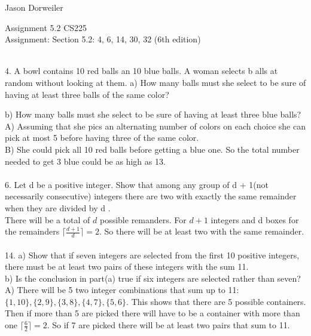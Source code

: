\documentclass[12]{article}
\begin{document}
Jason Dorweiler

Assignment 5.2 CS225\\
Assignment: Section 5.2: 4, 6, 14, 30, 32 (6th edition)

\hrulefill\\

4. A bowl contains 10 red balls an 10 blue balls. A woman selects b
alls at random without
looking at them.
a) How many balls must she select to be sure of having at least three balls of the same
color?

b) How many balls must she select to be sure of having at least three blue balls?\\


A) Assuming that she pics an alternating number of colors on each choice she can pick at most 5 before having three of the same color.\\

B) She could pick all 10 red balls before getting a blue one.  So the total number needed to get 3 blue could be as high as 13. \\

\hrulefill\\

6. Let
d
be a positive integer. Show that among any group of
d
+ 1(not necessarily consecutive) integers there are two with exactly the same remainder when they are divided by
d
.\\

There will be a total of $d$ possible remanders.  For $d+1$ integers and d boxes for the remainders $\lceil{\frac{d+1}{d}}\rceil = 2$.  So there will be at least two with the same remainder. \\

\hrulefill\\

14. a) Show that if seven integers are selected from the first 10 positive integers, there must
be at least two pairs of these integers with the sum 11.\\
	
b) Is the conclusion in part(a) true if six integers are selected
rather than seven?\\

A) There will be 5 two integer combinations that sum up to 11: $\{1,10\}, \{2,9\}, \{3,8\}, \{4,7\}, \{5,6\}$.  This shows that there are 5 possible containers.  Then if more than 5 are picked there will have to be a container with more than one $\lceil\frac{6}{2}\rceil = 2$.  So if 7 are picked there will be at least two pairs that sum to 11. \\
\end{document}
